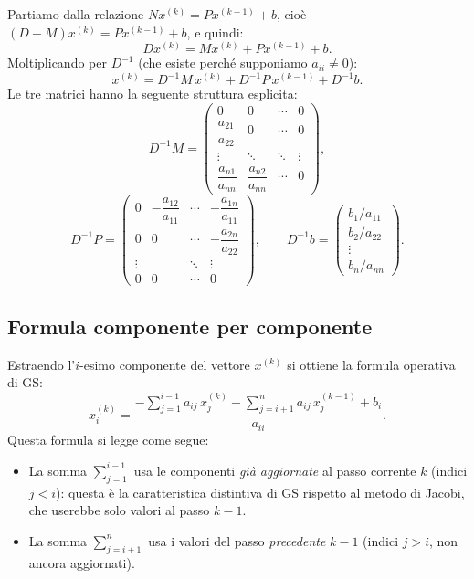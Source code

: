 \documentclass[a4paper,12pt]{article}
\theoremstyle{definition}
\theoremstyle{remark}
\begin{document}
Partiamo dalla relazione $Nx^{(k)} = Px^{(k-1)} + b$, cioè
$(D-M)x^{(k)} = Px^{(k-1)} + b$, e quindi:
\[
  Dx^{(k)} = Mx^{(k)} + Px^{(k-1)} + b.
\]
Moltiplicando per $D^{-1}$ (che esiste perché supponiamo $a_{ii} \neq 0$):
\[
  x^{(k)} = D^{-1}M\,x^{(k)} + D^{-1}P\,x^{(k-1)} + D^{-1}b.
\]
Le tre matrici hanno la seguente struttura esplicita:
\[
  D^{-1}M =
  \begin{pmatrix}
    0 & 0 & \cdots & 0 \\
    \dfrac{a_{21}}{a_{22}} & 0 & \cdots & 0 \\
    \vdots & \ddots & \ddots & \vdots \\
    \dfrac{a_{n1}}{a_{nn}} & \dfrac{a_{n2}}{a_{nn}} & \cdots & 0
  \end{pmatrix},
\]
\[
  D^{-1}P =
  \begin{pmatrix}
    0 & -\dfrac{a_{12}}{a_{11}} & \cdots & -\dfrac{a_{1n}}{a_{11}} \\
    0 & 0 & \cdots & -\dfrac{a_{2n}}{a_{22}} \\
    \vdots & & \ddots & \vdots \\
    0 & 0 & \cdots & 0
  \end{pmatrix},
  \qquad
  D^{-1}b =
  \begin{pmatrix}
    b_1/a_{11} \\ b_2/a_{22} \\ \vdots \\ b_n/a_{nn}
  \end{pmatrix}.
\]

\subsection{Formula componente per componente}

Estraendo l'$i$-esimo componente del vettore $x^{(k)}$ si ottiene la
formula operativa di GS:
\[
  \boxed{x_i^{(k)} =
    \frac{-\displaystyle\sum_{j=1}^{i-1} a_{ij}\,x_j^{(k)}
          -\displaystyle\sum_{j=i+1}^{n} a_{ij}\,x_j^{(k-1)} + b_i}
         {a_{ii}}}.
\]
Questa formula si legge come segue:
\begin{itemize}
  \item La somma $\sum_{j=1}^{i-1}$ usa le componenti \emph{già aggiornate}
        al passo corrente $k$ (indici $j < i$): questa è la caratteristica
        distintiva di GS rispetto al metodo di Jacobi, che userebbe solo
        valori al passo $k-1$.
  \item La somma $\sum_{j=i+1}^{n}$ usa i valori del passo \emph{precedente}
        $k-1$ (indici $j > i$, non ancora aggiornati).
\end{itemize}
\end{document}
